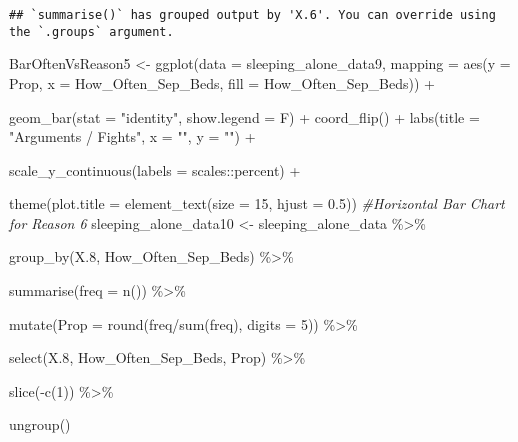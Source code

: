\documentclass[
]{article}
\newenvironment{Shaded}{\begin{snugshade}}{\end{snugshade}}
\newcommand{\AttributeTok}[1]{\textcolor[rgb]{0.77,0.63,0.00}{#1}}
\newcommand{\CommentTok}[1]{\textcolor[rgb]{0.56,0.35,0.01}{\textit{#1}}}
\newcommand{\DecValTok}[1]{\textcolor[rgb]{0.00,0.00,0.81}{#1}}
\newcommand{\FloatTok}[1]{\textcolor[rgb]{0.00,0.00,0.81}{#1}}
\newcommand{\FunctionTok}[1]{\textcolor[rgb]{0.00,0.00,0.00}{#1}}
\newcommand{\NormalTok}[1]{#1}
\newcommand{\OtherTok}[1]{\textcolor[rgb]{0.56,0.35,0.01}{#1}}
\newcommand{\SpecialCharTok}[1]{\textcolor[rgb]{0.00,0.00,0.00}{#1}}
\newcommand{\StringTok}[1]{\textcolor[rgb]{0.31,0.60,0.02}{#1}}
\begin{document}
\begin{verbatim}
## `summarise()` has grouped output by 'X.6'. You can override using the `.groups` argument.
\end{verbatim}

\begin{Shaded}
\begin{Highlighting}[]
\NormalTok{BarOftenVsReason5 }\OtherTok{\textless{}{-}} \FunctionTok{ggplot}\NormalTok{(}\AttributeTok{data =}\NormalTok{ sleeping\_alone\_data9,}
                               \AttributeTok{mapping =} \FunctionTok{aes}\NormalTok{(}\AttributeTok{y =}\NormalTok{ Prop,}
                                             \AttributeTok{x =}\NormalTok{ How\_Often\_Sep\_Beds,}
                                             \AttributeTok{fill =}\NormalTok{ How\_Often\_Sep\_Beds)) }\SpecialCharTok{+}
  
  \FunctionTok{geom\_bar}\NormalTok{(}\AttributeTok{stat =} \StringTok{"identity"}\NormalTok{,}
           \AttributeTok{show.legend =}\NormalTok{ F) }\SpecialCharTok{+} 
  \FunctionTok{coord\_flip}\NormalTok{() }\SpecialCharTok{+} 
  \FunctionTok{labs}\NormalTok{(}\AttributeTok{title =} \StringTok{"Arguments / Fights"}\NormalTok{,}
       \AttributeTok{x =} \StringTok{""}\NormalTok{,}
       \AttributeTok{y =} \StringTok{""}\NormalTok{) }\SpecialCharTok{+}
  
  \FunctionTok{scale\_y\_continuous}\NormalTok{(}\AttributeTok{labels =}\NormalTok{ scales}\SpecialCharTok{::}\NormalTok{percent) }\SpecialCharTok{+}
  
  \FunctionTok{theme}\NormalTok{(}\AttributeTok{plot.title =} \FunctionTok{element\_text}\NormalTok{(}\AttributeTok{size =} \DecValTok{15}\NormalTok{, }\AttributeTok{hjust =} \FloatTok{0.5}\NormalTok{))}
\CommentTok{\#Horizontal Bar Chart for Reason 6}
\NormalTok{sleeping\_alone\_data10 }\OtherTok{\textless{}{-}}\NormalTok{ sleeping\_alone\_data }\SpecialCharTok{\%\textgreater{}\%} 
  
  \FunctionTok{group\_by}\NormalTok{(X}\FloatTok{.8}\NormalTok{, How\_Often\_Sep\_Beds) }\SpecialCharTok{\%\textgreater{}\%} 
  
  \FunctionTok{summarise}\NormalTok{(}\AttributeTok{freq =} \FunctionTok{n}\NormalTok{()) }\SpecialCharTok{\%\textgreater{}\%} 
  
  \FunctionTok{mutate}\NormalTok{(}\AttributeTok{Prop =} \FunctionTok{round}\NormalTok{(freq}\SpecialCharTok{/}\FunctionTok{sum}\NormalTok{(freq), }\AttributeTok{digits =} \DecValTok{5}\NormalTok{)) }\SpecialCharTok{\%\textgreater{}\%} 
  
  \FunctionTok{select}\NormalTok{(X}\FloatTok{.8}\NormalTok{, How\_Often\_Sep\_Beds, Prop) }\SpecialCharTok{\%\textgreater{}\%} 
  
  \FunctionTok{slice}\NormalTok{(}\SpecialCharTok{{-}}\FunctionTok{c}\NormalTok{(}\DecValTok{1}\NormalTok{)) }\SpecialCharTok{\%\textgreater{}\%} 
  
  \FunctionTok{ungroup}\NormalTok{()}
\end{Highlighting}
\end{Shaded}
\end{document}
